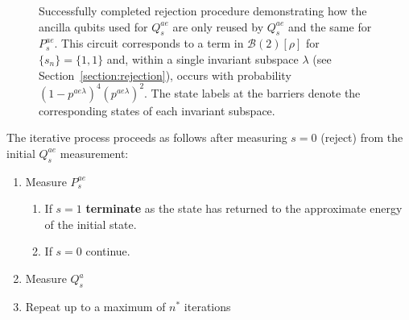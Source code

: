 \documentclass[aps,floatfix,10pt,amssymb,amsfont,amsmath,superscriptaddress,float,nofootinbib,longbibliography,nobalancelastpage,twocolumn]{revtex4-2}
\begin{document}
\begin{figure}
\caption{Successfully completed rejection procedure demonstrating how the ancilla qubits used for $Q_s^{ae}$ are only reused by $Q_s^{ae}$ and the same for $P_s^{ae}$. This circuit corresponds to a term in $\mathcal{B}(2)[\rho]$ for $\{s_n\} = \{1,1\}$ and, within a single invariant subspace $\lambda$ (see Section~\ref{section:rejection}), occurs with probability $(1-p^{ae\lambda})^4(p^{ae\lambda})^2$. The state labels at the barriers denote the corresponding states of each invariant subspace.}
\label{fig:fullcircuit}
\end{figure}

The iterative process proceeds as follows after measuring $s=0$ (reject) from the initial $Q_s^{ae}$ measurement: 
\begin{enumerate}
    \item Measure $P_s^{ae}$
        \begin{enumerate}
            \item If $s=1$ \textbf{terminate} as the state has returned to the approximate energy of the initial state.
            \item If $s=0$ continue.
        \end{enumerate}
    \item Measure $Q_s^a$
    \item Repeat up to a maximum of $n^*$ iterations
\end{enumerate}
\end{document}
